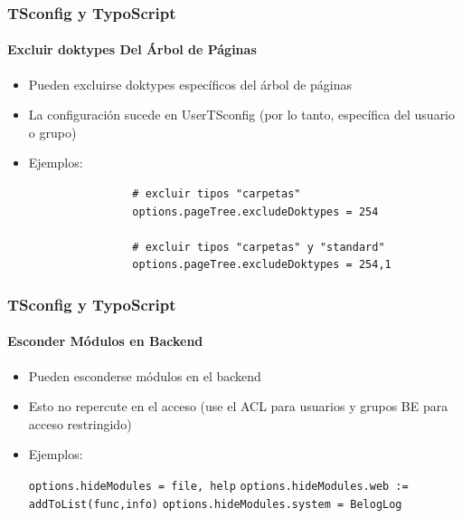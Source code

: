 
\begin{frame}[fragile]
	\frametitle{TSconfig y TypoScript}
	\framesubtitle{Excluir doktypes Del Árbol de Páginas}

	\begin{itemize}

		\item Pueden excluirse doktypes específicos del árbol de páginas
		\item La configuración sucede en UserTSconfig (por lo tanto, específica del usuario o grupo)
		\item Ejemplos:

			\begin{lstlisting}
				# excluir tipos "carpetas"
				options.pageTree.excludeDoktypes = 254

				# excluir tipos "carpetas" y "standard"
				options.pageTree.excludeDoktypes = 254,1
			\end{lstlisting}

	\end{itemize}

\end{frame}


\begin{frame}[fragile]
	\frametitle{TSconfig y TypoScript}
	\framesubtitle{Esconder Módulos en Backend}

	\begin{itemize}

		\item Pueden esconderse módulos en el backend
		\item Esto no repercute en el acceso\newline
			(use el ACL para usuarios y grupos BE para acceso restringido)
		\item Ejemplos:

			\lstinline!options.hideModules = file, help!
			\lstinline!options.hideModules.web := addToList(func,info)!
			\lstinline!options.hideModules.system = BelogLog!

	\end{itemize}

\end{frame}

